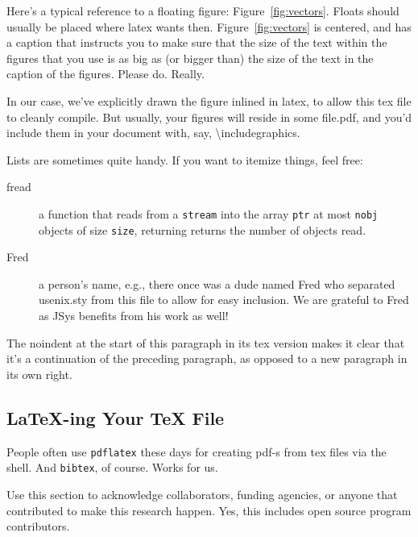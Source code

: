Here's a typical reference to a floating figure: Figure~\ref{fig:vectors}.
Floats should usually be placed where latex wants then. Figure~\ref{fig:vectors}
is centered, and has a caption that instructs you to make sure that the size of
the text within the figures that you use is as big as (or bigger than) the size
of the text in the caption of the figures. Please do. Really.

In our case, we've explicitly drawn the figure inlined in latex, to allow this
tex file to cleanly compile. But usually, your figures will reside in some
file.pdf, and you'd include them in your document with, say,
\textbackslash{}includegraphics.

Lists are sometimes quite handy. If you want to itemize things, feel free:

\begin{description}
  
\item[fread] a function that reads from a \texttt{stream} into the array
  \texttt{ptr} at most \texttt{nobj} objects of size \texttt{size}, returning
  returns the number of objects read.

\item[Fred] a person's name, e.g., there once was a dude named Fred who
  separated usenix.sty from this file to allow for easy inclusion. We are
  grateful to Fred as JSys benefits from his work as well! 
\end{description}

\noindent
The noindent at the start of this paragraph in its tex version makes it clear
that it's a continuation of the preceding paragraph, as opposed to a new
paragraph in its own right.


\subsection{LaTeX-ing Your TeX File}

People often use \texttt{pdflatex} these days for creating pdf-s from tex files
via the shell. And \texttt{bibtex}, of course. Works for us.

\acks

Use this section to acknowledge collaborators, funding agencies, or anyone that
contributed to make this research happen. Yes, this includes open source program
contributors.

